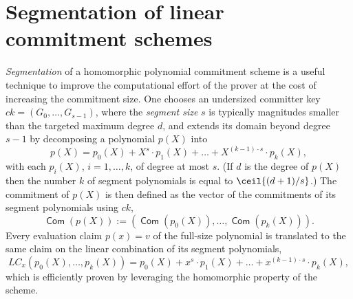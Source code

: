 \documentclass[10pt,article,oneside]{memoir}
\theoremstyle{definition}
\theoremstyle{remark}
\DeclareMathOperator{\comm}{\mathsf{Com}}
\begin{document}



\section{Segmentation of linear commitment schemes}
\label{s:Segmentation}

\textit{Segmentation} of a homomorphic polynomial commitment scheme is a useful technique to improve the computational effort of the prover at the cost of increasing the commitment size\footnotemark.
One chooses an undersized committer key $ck=(G_0,\ldots,G_{s-1})$, where the \textit{segment size} $s$ is typically magnitudes smaller than the targeted maximum degree $d$, and extends its domain beyond degree $s-1$ by decomposing a polynomial $p(X)$ into
\[
p(X) = p_0(X) + X^s\cdot p_1(X) + \ldots + X^{(k-1)\cdot s} \cdot p_k(X), 
\]
with each $p_i(X)$, $i=1,\ldots, k$, of degree at most $s$. 
(If $d$ is the degree of $p(X)$ then the number $k$ of segment polynomials is equal to $\ceil{(d+1)/s}$.) 
The commitment of $p(X)$ is then defined as the vector of the commitments of its segment polynomials using $ck$, 
\[
\comm(p(X)) := \left(\comm(p_0(X)),\ldots, \comm(p_k(X))\right).
\]
Every evaluation claim $p(x)=v$ of the full-size polynomial is translated to the same claim on the linear combination of its segment polynomials,
\[
LC_x(p_0(X),\ldots,p_k(X)) = 
p_0(X) + x^s\cdot p_1(X) + \ldots + x^{(k-1)\cdot s} \cdot p_k(X),
\]
which is efficiently proven by leveraging the homomorphic property of the scheme.

\end{document}
